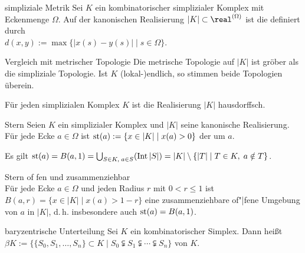 \begin{Def}{simpliziale Metrik}
    Sei $K$ ein kombinatorischer simplizialer Komplex mit Eckenmenge $\Omega$.
    Auf der kanonischen Realisierung $|K| \subset \real^{(\Omega)}$
    ist die  definiert durch \\
    $d(x, y) := \max\{|x(s) - y(s)| \;|\; s \in \Omega\}$.
\end{Def}

\begin{Satz}{Vergleich mit metrischer Topologie}
    Die metrische Topologie auf $|K|$ ist gröber als die simpliziale Topologie.
    Ist $K$ (lokal-)endlich, so stimmen beide Topologien überein.
\end{Satz}

\begin{Kor}
    Für jeden simplizialen Komplex $K$ ist die Realisierung $|K|$ hausdorffsch.
\end{Kor}

\linie

\begin{Def}{Stern}
    Seien $K$ ein simplizialer Komplex und $|K|$ seine kanonische
    Realisierung. \\
    Für jede Ecke $a \in \Omega$ ist $\operatorname{st}(a) := \{x \in |K| \;|\; x(a) > 0\}$
    der  um $a$.
\end{Def}

\begin{Bem}
    Es gilt $\operatorname{st}(a) = B(a, 1) = \bigcup_{S \in K,\; a \in S} (\operatorname{Int} |S|)
    = |K| \setminus \{|T| \;|\; T \in K,\; a \notin T\}$.
\end{Bem}

\begin{Satz}{Stern of\!\! fen und zusammenziehbar}\\
    Für jede Ecke $a \in \Omega$ und jeden Radius $r$ mit $0 < r \le 1$ ist
    $B(a, r) = \{x \in |K| \;|\; x(a) > 1 - r\}$
    eine zusammenziehbare of"|fene Umgebung von $a$ in $|K|$,
    d.\,h. insbesondere auch $\operatorname{st}(a) = B(a, 1)$.
\end{Satz}

\linie

\begin{Def}{baryzentrische Unterteilung}
    Sei $K$ ein kombinatorischer Simplex.
    Dann heißt \\
    $\beta K := \{\{S_0, S_1, \dotsc, S_n\} \subset K \;|\;
    S_0 \subsetneqq S_1 \subsetneqq \dotsb \subsetneqq S_n\}$
     von $K$.
\end{Def}

